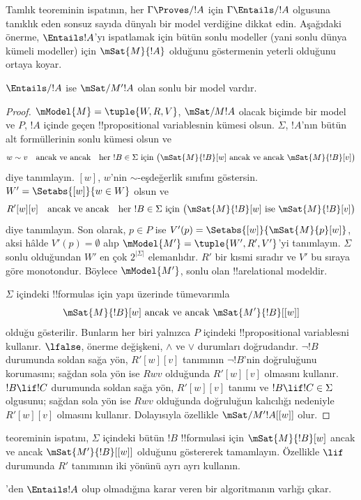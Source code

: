 


Tamlık teoreminin ispatının, her $\Gamma\Proves/ !A$ için
$\Gamma\Entails/ !A$ olgusuna tanıklık eden sonsuz sayıda dünyalı bir model
verdiğine dikkat edin. Aşağıdaki önerme, $\Entails !A$'yı ispatlamak için
bütün sonlu modeller (yani sonlu dünya kümeli modeller) için
$\mSat{M}{!A}$ olduğunu göstermenin yeterli olduğunu ortaya koyar.

\begin{thm}
  $\Entails/ !A$ ise $\mSat/{M'}{!A}$ olan sonlu bir model vardır.
\end{thm}

\begin{proof}
  $\mModel{M}=\tuple{W,R,V}$, $\mSat/{M}{!A}$ olacak biçimde bir model ve
  $P$, $!A$ içinde geçen !!{propositional variable}s{}nin kümesi olsun.
  $\Sigma$, $!A$'nın bütün alt formüllerinin sonlu kümesi olsun ve
  \[
    w\sim v \quad\text{ancak ve ancak}\quad
    \text{her $!B\in\Sigma$ için }
    \bigl(\mSat{M}{!B}[w]\text{ ancak ve ancak }\mSat{M}{!B}[v]\bigr)
  \]
  diye tanımlayın. $[w]$, $w$'nin $\sim$-eşdeğerlik sınıfını göstersin.
  $W'=\Setabs{[w]}{w\in W}$ olsun ve
  \[
    R'[w][v] \quad\text{ancak ve ancak}\quad
    \text{her $!B\in\Sigma$ için }
    \bigl(\mSat{M}{!B}[w]\text{ ise }\mSat{M}{!B}[v]\bigr)
  \]
  diye tanımlayın. Son olarak, $p\in P$ ise
  $V'(p)=\Setabs{[w]}{\mSat{M}{p}[w]}$, aksi hâlde $V'(p)=\emptyset$ alıp
  $\mModel{M'}=\tuple{W',R',V'}$'yi tanımlayın. $\Sigma$ sonlu olduğundan
  $W'$ en çok $2^{|\Sigma|}$ elemanlıdır. $R'$ bir kısmi sıradır ve $V'$
  bu sıraya göre monotondur. Böylece $\mModel{M'}$, sonlu olan
  !!a{relational model}{}dir.

  $\Sigma$ içindeki !!{formula}s için yapı üzerinde tümevarımla
  \[
    \mSat{M}{!B}[w] \text{ ancak ve ancak } \mSat{M'}{!B}[{[w]}]
  \]
  olduğu gösterilir. Bunların her biri yalnızca $P$ içindeki
  !!{propositional variable}s{}ni kullanır. $\lfalse$, önerme değişkeni,
  $\land$ ve $\lor$ durumları doğrudandır. $\lnot !B$ durumunda soldan sağa
  yön, $R'[w][v]$ tanımının $\lnot !B$'nin doğruluğunu korumasını; sağdan
  sola yön ise $Rwv$ olduğunda $R'[w][v]$ olmasını kullanır.
  $!B\lif !C$ durumunda
  soldan sağa yön, $R'[w][v]$ tanımı ve
  $!B\lif !C\in\Sigma$ olgusunu; sağdan sola yön ise $Rwv$ olduğunda
  doğruluğun kalıcılığı nedeniyle $R'[w][v]$ olmasını kullanır.
  Dolayısıyla özellikle $\mSat/{M'}{!A}[{[w]}]$ olur.
\end{proof}

\begin{prob}
 teoreminin ispatını, $\Sigma$
içindeki bütün $!B$ !!{formula}s{}i için
$\mSat{M}{!B}[w]$ ancak ve ancak $\mSat{M'}{!B}[{[w]}]$ olduğunu göstererek
tamamlayın. Özellikle $\lif$ durumunda $R'$ tanımının iki yönünü ayrı ayrı
kullanın.
\end{prob}

'den $\Entails !A$ olup olmadığına karar veren
bir algoritmanın varlığı çıkar.

